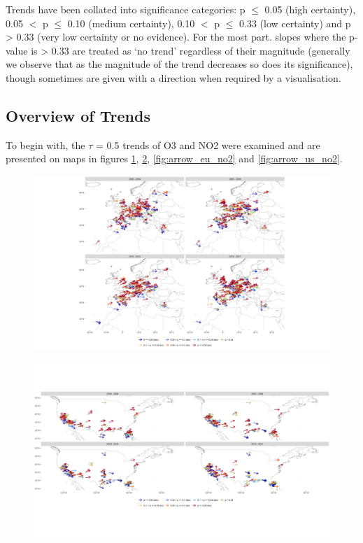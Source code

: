 \documentclass[journal abbreviation, manuscript]{copernicus}
\begin{document}
Trends have been collated into significance categories: p $\le$ 0.05 (high certainty), 0.05 $<$ p $\le$ 0.10 (medium certainty), 0.10 $<$ p $\le$ 0.33 (low certainty) and p > 0.33 (very low certainty or no evidence). For the most part. slopes where the p-value is > 0.33 are treated as ‘no trend’ regardless of their magnitude (generally we observe that as the magnitude of the trend decreases so does its significance), though sometimes are given with a direction when required by a visualisation.

\subsection{Overview of Trends} \label{sect:overview_of_trends}
To begin with, the $\tau$ = 0.5 trends of O3 and NO2 were examined and are presented on maps in figures \ref{fig:arrow_eu_o3}, \ref{fig:arrow_us_o3}, \ref{fig:arrow_eu_no2} and \ref{fig:arrow_us_no2}.

\begin{figure}[htbp]
\includegraphics[width=12cm]{plots/arrow_maps/o3/11/EU_map_spc_o3_tau_0.5_seg_11_14.png}
\caption{}
\label{fig:arrow_eu_o3}
\end{figure}

\begin{figure}[htbp]
\includegraphics[width=12cm]{plots/arrow_maps/o3/11/US_map_spc_o3_tau_0.5_seg_11_14.png}
\caption{}
\label{fig:arrow_us_o3}
\end{figure}
\end{document}
